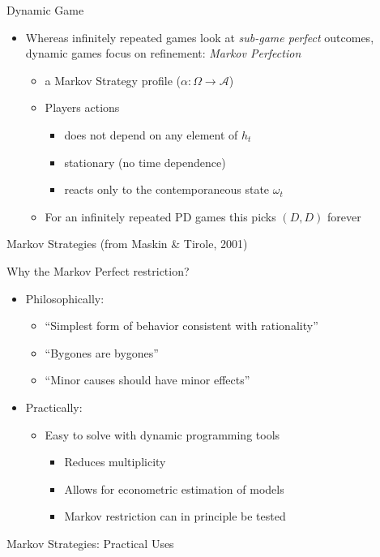 \documentclass{beamer}
\begin{document}
\begin{frame}{Dynamic Game}
\begin{itemize}
\item Whereas infinitely repeated games look at \emph{sub-game perfect}
outcomes, dynamic games focus on refinement: \emph{Markov Perfection}

\begin{itemize}
\item a Markov Strategy profile ($\alpha:\Omega\rightarrow\mathcal{A}$)
\item Players actions

\begin{itemize}
\item does not depend on any element of $h_{t}$
\item stationary (no time dependence)
\item reacts only to the contemporaneous state $\omega_{t}$
\end{itemize}
\item For an infinitely repeated PD games this picks $(D,D)$ forever
\end{itemize}
\end{itemize}
\end{frame}\begin{frame}{Markov Strategies (from Maskin \& Tirole, 2001)}

Why the Markov Perfect restriction?
\begin{itemize}
\item Philosophically:

\begin{itemize}
\item ``Simplest form of behavior consistent with rationality''
\item ``Bygones are bygones''
\item ``Minor causes should have minor effects''
\end{itemize}
\item Practically:

\begin{itemize}
\item Easy to solve with dynamic programming tools

\begin{itemize}
\item Reduces multiplicity
\item Allows for econometric estimation of models
\item Markov restriction can in principle be tested
\end{itemize}
\end{itemize}
\end{itemize}
\end{frame} \begin{frame}{Markov Strategies: Practical Uses}


\end{frame}
\end{document}
